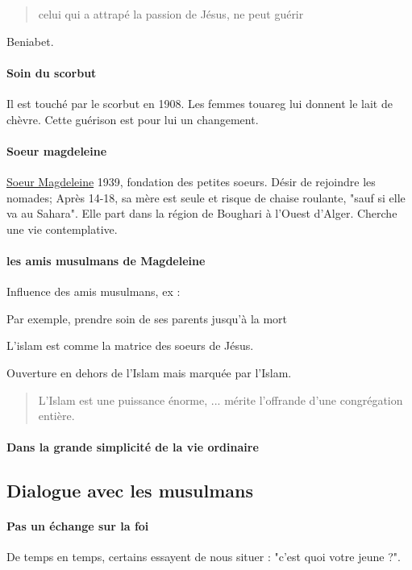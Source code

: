 \begin{quote}
    celui qui a attrapé la passion de Jésus, ne peut guérir
\end{quote}
Beniabet.


\paragraph{Soin du scorbut} Il est touché par le scorbut en 1908. Les femmes touareg lui donnent le lait de chèvre. Cette guérison est pour lui un changement. 

\paragraph{Soeur magdeleine} \href{https://fr.wikipedia.org/wiki/Magdeleine_Hutin}{Soeur Magdeleine} 1939, fondation des petites soeurs. Désir de rejoindre les nomades; Après 14-18, sa mère est seule et risque de chaise roulante, "sauf si elle va au Sahara". Elle part dans la région de Boughari à l'Ouest d'Alger. Cherche une vie contemplative. 

\paragraph{les amis musulmans de Magdeleine} Influence des amis musulmans, ex : 
\begin{Ex}
    Par exemple, prendre soin de ses parents jusqu'à la mort
\end{Ex}

\begin{Synthesis}
L'islam est comme la matrice des soeurs de Jésus.
\end{Synthesis}
Ouverture en dehors de l'Islam mais marquée par l'Islam.
\begin{quote}
    L'Islam est une puissance énorme, ... mérite l'offrande d'une congrégation entière. 
\end{quote}

\paragraph{Dans la grande simplicité de la vie ordinaire}

\subsection{Dialogue avec les musulmans}

\paragraph{Pas un échange sur la foi} De temps en temps, certains essayent de nous situer : "c'est quoi votre jeune ?".


